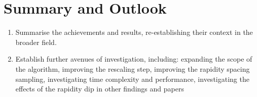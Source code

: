 \documentclass[12pt,a4paper]{report}
\begin{document}
\chapter{Summary and Outlook}
\begin{enumerate}
\item Summarise the achievements and results, re-establishing their context in the broader field.
\item Establish further avenues of investigation, including: expanding the scope of the algorithm, improving the rescaling step, improving the rapidity spacing sampling, investigating time complexity and performance, investigating the effects of the rapidity dip in other findings and papers
\end{enumerate}



\end{document}
